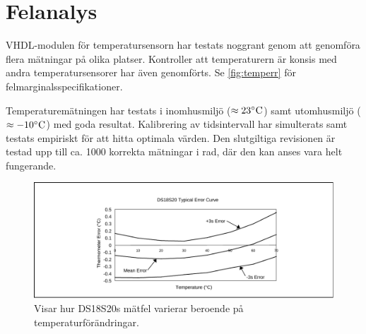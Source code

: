\section{Felanalys}
VHDL-modulen för temperatursensorn har testats noggrant genom att genomföra flera mätningar på olika platser.
Kontroller att temperaturern är konsis med andra temperatursensorer har även genomförts. Se \autoref{fig:temperr} för felmarginalsspecifikationer.

Temperaturemätningen har testats i inomhusmiljö ($\approx 23^\circ\mathrm{C}$) samt utomhusmiljö ($\approx -10^\circ\mathrm{C}$) med goda resultat.
Kalibrering av tidsintervall har simulterats samt testats empiriskt för att hitta optimala värden. Den slutgiltiga revisionen är testad upp till ca. 1000 korrekta mätningar i rad, där den kan anses vara helt fungerande.


\begin{figure}[htp]
\centering
\includegraphics[width=\textwidth]{temp_error.pdf}
\caption{Visar hur DS18S20s mätfel varierar beroende på temperaturförändringar.}
\label{fig:temperr}
\end{figure}